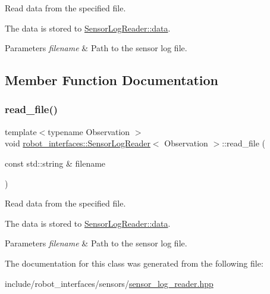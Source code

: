 Read data from the specified file. 

The data is stored to \hyperlink{classrobot__interfaces_1_1SensorLogReader_ae9bc7102e1de64979d2937f465eea9cc}{Sensor\+Log\+Reader\+::data}.


\begin{DoxyParams}{Parameters}
{\em filename} & Path to the sensor log file. \\
\hline
\end{DoxyParams}


\subsection{Member Function Documentation}
\mbox{\label{classrobot__interfaces_1_1SensorLogReader_a2632219304890e40ff770b1dfef72e6c}} 
\subsubsection{\texorpdfstring{read\+\_\+file()}{read\_file()}}
{\footnotesize\ttfamily template$<$typename Observation $>$ \\
void \hyperlink{classrobot__interfaces_1_1SensorLogReader}{robot\+\_\+interfaces\+::\+Sensor\+Log\+Reader}$<$ Observation $>$\+::read\+\_\+file (\begin{DoxyParamCaption}\item[{const std\+::string \&}]{filename }\end{DoxyParamCaption})\hspace{0.3cm}{\ttfamily [inline]}}



Read data from the specified file. 

The data is stored to \hyperlink{classrobot__interfaces_1_1SensorLogReader_ae9bc7102e1de64979d2937f465eea9cc}{Sensor\+Log\+Reader\+::data}.


\begin{DoxyParams}{Parameters}
{\em filename} & Path to the sensor log file. \\
\hline
\end{DoxyParams}


The documentation for this class was generated from the following file\+:\begin{DoxyCompactItemize}
\item 
include/robot\+\_\+interfaces/sensors/\hyperlink{sensor__log__reader_8hpp}{sensor\+\_\+log\+\_\+reader.\+hpp}\end{DoxyCompactItemize}

